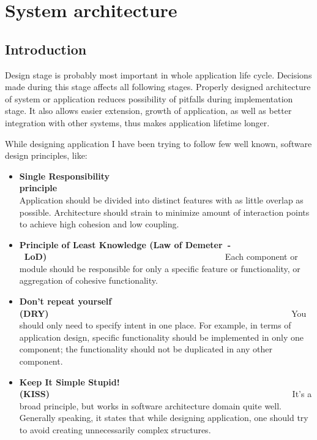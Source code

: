 %


\chapter{System architecture}
\label{cha:sys_arch}


\section{Introduction}
\label{sec:ch5_gui}

Design stage is probably most important in whole application life cycle. Decisions made during this stage affects 
all following stages. Properly designed architecture of system or application reduces possibility of pitfalls during
implementation stage. It also allows easier extension, growth of application, as well as better integration with other
systems, thus makes application lifetime longer. 

While designing application I have been trying to follow few well known, software design principles, like:
\begin{itemize}
 \item {\bf Single Responsibility
principle}~~~~~~~~~~~~~~~~~~~~~~~~~~~~~~~~~~~~~~~~~~~~~~~~~~~~~~~~\linebreak
Application should be divided into distinct features with as
little overlap as possible. Architecture should strain to minimize amount of interaction points to achieve high cohesion
and low coupling.
 \item {\bf Principle of Least Knowledge (Law of Demeter~-~LoD)}~~~~~~~~~~~~~~~~~~~~~~~~~~~~~~~~~~~~~~~~~\linebreak
Each component or module should be responsible for only a specific feature or functionality, or aggregation of cohesive
functionality.
 \item {\bf Don't repeat yourself (DRY)}~~~~~~~~~~~~~~~~~~~~~~~~~~~~~~~~~~~~~~~~~~~~~~~~~~~~~~~~\linebreak
You should only need to specify intent in one place. For example, in terms of application design, specific functionality
should be implemented in only one component; the functionality should not be duplicated in any other component.
 \item {\bf Keep It Simple Stupid! (KISS)}~~~~~~~~~~~~~~~~~~~~~~~~~~~~~~~~~~~~~~~~~~~~~~~~~~~~~~~~\linebreak
It's a broad principle, but works in software architecture domain quite well. Generally speaking, it states that while
designing application, one should try to avoid creating unnecessarily complex structures.
\end{itemize}

